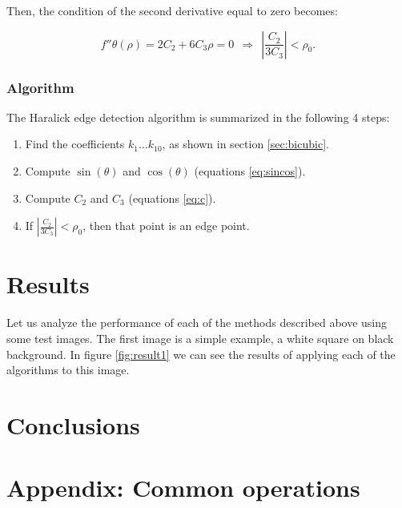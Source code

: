\documentclass{ipol}
\numberwithin{equation}{section}
\numberwithin{table}{section}
\begin{document}
Then, the condition of the second derivative equal to zero becomes:

\begin{equation}
	f''{\theta}(\rho) = 2C_2 + 6C_3\rho = 0 \ \ \Rightarrow \ \ \left| \frac{C_2}{3C_3} \right| < \rho_0.
\end{equation}

\subsubsection{Algorithm}

The Haralick edge detection algorithm is summarized in the following 4 steps:

\begin{enumerate}
	\item Find the coefficients $k_1 \hdots k_{10}$, as shown in section \ref{sec:bicubic}.
	\item Compute $\sin(\theta)$ and $\cos(\theta)$ (equations \ref{eq:sincos}).
	\item Compute $C_2$ and $C_3$ (equations \ref{eq:c}).
	\item If $\left| \frac{C_2}{3C_3} \right| < \rho_0$, then that point is an edge point.
\end{enumerate}

\section{Results}
\label{sec:results}

Let us analyze the performance of each of the methods described above using some test images. The first image 
is a simple example, a white square on black background. In figure \ref{fig:result1} we can see the results 
of applying each of the algorithms to this image.




\section{Conclusions}
\label{sec:conclusions}


\section{Appendix: Common operations}
\label{sec:appendix1}
\end{document}
